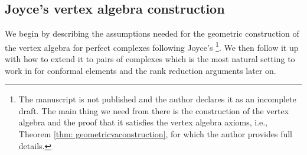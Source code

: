 \documentclass[a4paper, 12pt]{amsart}
\begin{document}
\subsection{Joyce's vertex algebra construction}\label{sec: Joycevertexalgebra}

We begin by describing the assumptions needed for the geometric construction of the vertex algebra for perfect complexes following Joyce's \cite{Jo17}\footnote{The manuscript \cite{Jo17} is not published and the author declares it as an incomplete draft. The main thing we need from there is the construction of the vertex algebra and the proof that it satisfies the vertex algebra axioms, i.e., Theorem \ref{thm: geometricvaconstruction}, for which the author provides full details.}. We then follow it up with how to extend it to pairs of complexes which is the most natural setting to work in for conformal elements and the rank reduction arguments later on.
\end{document}
